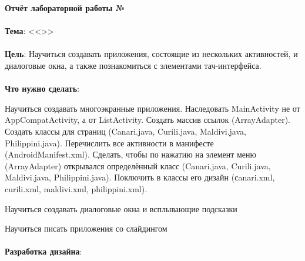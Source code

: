 \documentclass[12pt, a4paper, simple]{eskdtext}
\def \gpiDocTopic {Отчёт лабораторной работы №\gpiDocNum}
\begin{document}
    
    \begin{center}
        \textbf{\gpiDocTopic}
    \end{center}

    \paragraph{} \textbf{Тема}: <<\gpiTopicRep>>

    \paragraph{} \textbf{Цель}: Научиться создавать приложения, состоящие из нескольких активностей,
    и диалоговые окна, а также познакомиться с элементами тач-интерфейса.

    \paragraph{} \textbf{Что нужно сделать}:

    Научиться создавать многоэкранные приложения. Наследовать MainActivity не от\\ AppCompatActivity, а от ListActivity.
    Создать массив ссылок (ArrayAdapter). Создать классы для страниц (Canari.java, Curili.java, Maldivi.java, Philippini.java).
    Перечислить все активности в манифесте (AndroidManifest.xml).
    Сделать, чтобы по нажатию на элемент меню (ArrayAdapter) открывался определённый класс (Canari.java, Curili.java, Maldivi.java, Philippini.java).
    Поключить в классы его дизайн (сanari.xml, curili.xml, maldivi.xml, philippini.xml).

    Научиться создавать диалоговые окна и всплывающие подсказки

    Научиться писать приложения со слайдингом

    \paragraph{} \textbf{Разработка дизайна}:
\end{document}
